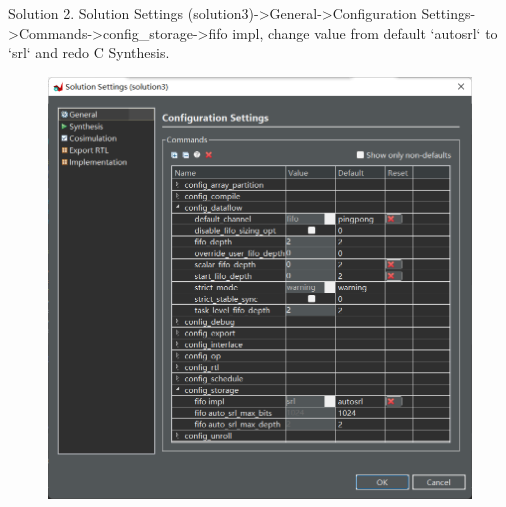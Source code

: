 \documentclass[a4paper,12pt,twoside]{article}
\begin{document}
Solution 2. Solution Settings (solution3)->General->Configuration Settings->Commands->config\_storage->fifo impl, change value from default `autosrl` to `srl` and redo C Synthesis.
\begin{figure}[H]
    \centering
    \includegraphics[width=\textwidth]{images/8.png}
\end{figure}
\end{document}
